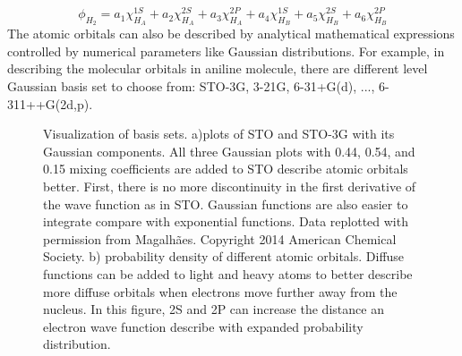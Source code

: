 \documentclass[
journal=jpcbfk, %
manuscript=article]{achemso}
\begin{document}
	\begin{equation}
	\label{eq:basisSet2}
	\phi_{H_{2}} =a_{1}\chi^{1S}_{H_{A}}+a_{2}\chi^{2S}_{H_{A}}+a_{3}\chi^{2P}_{H_{A}}+a_{4}\chi^{1S}_{H_{B}}+a_{5}\chi^{2S}_{H_{B}}+a_{6}\chi^{2P}_{H_{B}}
	\end{equation}
	The atomic orbitals can also be described by analytical mathematical expressions controlled by numerical parameters like Gaussian distributions. For example, in describing the molecular orbitals in aniline molecule, there are different level Gaussian basis set to choose from: STO-3G, 3-21G, 6-31+G(d), ...,  6-311++G(2d,p).
	\begin{figure}[!tbp]
		\centering
		\begin{subfigure}[b]{0.48\textwidth}
			\caption{}
			\label{fig:visualizingBasisSetsa)}
		\end{subfigure}
		\hfill
		\begin{subfigure}[b]{0.48\textwidth}
			\caption{}
			\label{fig:visualizingBasisSetsb)}
		\end{subfigure}
		\caption{Visualization of basis sets. a)plots of STO and STO-3G with its Gaussian components. All three Gaussian plots with 0.44, 0.54, and 0.15 mixing coefficients are added to STO describe atomic orbitals better. First, there is no more discontinuity in the first derivative of the wave function as in STO. Gaussian functions are also easier to integrate compare with exponential functions. Data replotted with permission from Magalh{\~a}es\cite{Magalhaes2014}. Copyright 2014 American Chemical Society. b) probability density of different atomic orbitals. Diffuse functions can be added to light and heavy atoms to better describe more diffuse orbitals when electrons move further away from the nucleus. In this figure, 2S and 2P can increase the distance an electron wave function describe with expanded probability distribution.}\label{fig:visualizingBasisSets}
	\end{figure}
\end{document}

